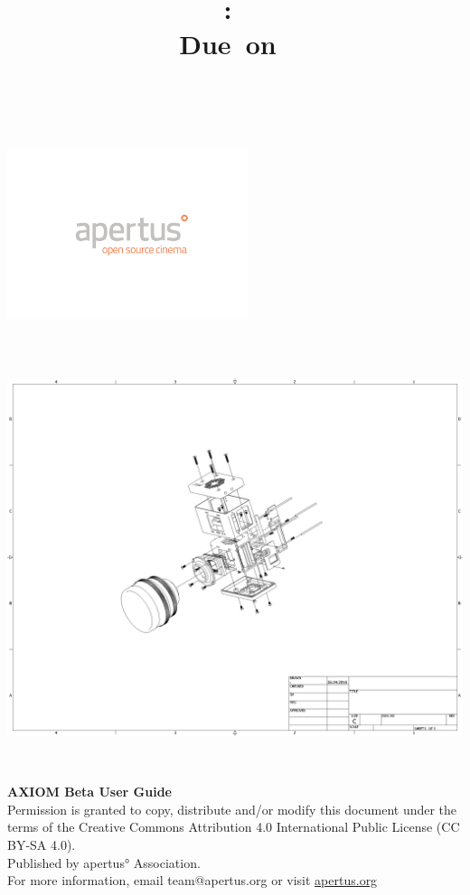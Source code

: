 \documentclass{article}
\title{
\vspace{2in}
\textmd{\textbf{\hmwkClass:\ \hmwkTitle}}\\
\normalsize\vspace{0.1in}\small{Due\ on\ \hmwkDueDate}\\
\vspace{0.1in}\large{\textit{\hmwkClassInstructor\ \hmwkClassTime}}
\vspace{3in}
}
\author{\textbf{\hmwkAuthorName}}
\date{} %
\begin{document}
\begin{titlepage}
\begin{center}
\includegraphics[height=5cm]{images/Apertus_Logo_FullText}\\
\end{center}
\includegraphics[height=13cm]{images/explosion-full}\\

\textbf{AXIOM Beta User Guide}\\

Permission is granted to copy, distribute and/or modify this document under the terms of the Creative Commons Attribution 4.0 International Public License (CC BY-SA 4.0).\\

Published by apertus° Association.\\


For more information, email team@apertus.org or visit \href{https://apertus.org}{apertus.org}

\end{titlepage}
\end{document}
